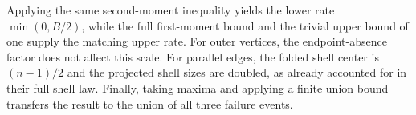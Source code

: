 Applying the same second-moment inequality yields the lower rate $\min(0,B/2)$, while the full first-moment bound and the trivial upper bound of one supply the matching upper rate. For outer vertices, the endpoint-absence factor does not affect this scale. For parallel edges, the folded shell center is $(n-1)/2$ and the projected shell sizes are doubled, as already accounted for in their full shell law. Finally, taking maxima and applying a finite union bound transfers the result to the union of all three failure events.
